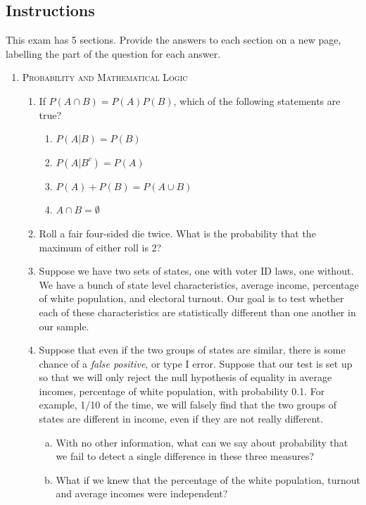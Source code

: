 \documentclass[11pt,letterpaper]{article}
\theoremstyle{definition}
\numberwithin{equation}{section}
\begin{document}
\subsection*{Instructions}
This exam has 5 sections.  Provide the answers to each section on a new page, labelling the part of the question for each answer.  
\begin{enumerate}[I]
\item \textsc{Probability and Mathematical Logic }
\begin{enumerate}[1)]
\item If $P(A\cap B)=P(A)P(B)$, which of the following statements are true?
\begin{enumerate}
\item[a)] $P(A|B)=P(B)$ 
\item[b)] $P(A|B^c)=P(A)$ 
\item[c)] $P(A)+P(B)=P(A\cup B)$ 
\item[d)] $A\cap B=\emptyset$
\end{enumerate}


\item Roll a fair four-sided die twice. What is the probability that the maximum of either roll is 2?
\bigskip

\item Suppose we have two sets of states, one with voter ID laws, one without.  We have a bunch of state level characteristics, average income, percentage of white population, and electoral turnout.  Our goal is to test whether each of these characteristics are statistically different than one another in our sample.
\bigskip
\item[] Suppose that even if the two groups of states are similar, there is some chance of a \emph{false positive}, or type I error.  Suppose that our test is set up so that we will only reject the null hypothesis of equality in average incomes, percentage of white population, with probability 0.1.  For example, 1/10 of the time, we will falsely find that the two groups of states are different in income, even if they are not really different.  
\begin{enumerate}[a)]
\item With no other information, what can we say about probability that we fail to detect a single difference in these three measures?
\item What if we knew that the percentage of the white population, turnout and average incomes were independent? 
\end{enumerate}
\bigskip


\end{enumerate}
\end{enumerate}
\end{document}
